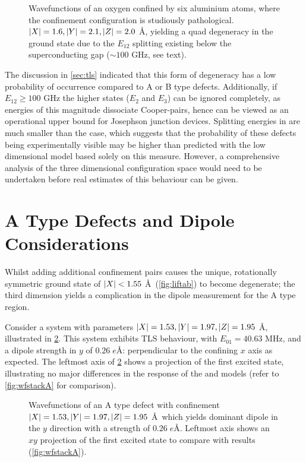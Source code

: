 \begin{figure}[htp]
  \resizebox{\textwidth}{!}{}
  \caption[Quad Degeneracy Configuration]{\label{fig:linequad}Wavefunctions of an oxygen confined by six aluminium atoms, where the confinement configuration is studiously pathological. $\lvert X\rvert = 1.6, \lvert Y\rvert = 2.1, \lvert Z\rvert = 2.0$ \AA, yielding a quad degeneracy in the ground state due to the $E_{12}$ splitting existing below the superconducting gap ($\sim\! 100$ GHz, see text).  }
\end{figure}

The discussion in \cref{sec:tls} indicated that this form of degeneracy has a low probability of occurrence compared to A or B type defects.
Additionally, if $E_{12} \geq 100$ GHz the higher states ($E_{2}$ and $E_{3}$) can be ignored completely, as energies of this magnitude dissociate Cooper-pairs, hence can be viewed as an operational upper bound for Josephson junction devices.
Splitting energies in  are much smaller than the  case, which suggests that the probability of these defects being experimentally visible may be higher than predicted with the low dimensional model based solely on this measure.
However, a comprehensive analysis of the three dimensional configuration space would need to be undertaken before real estimates of this behaviour can be given.

\section{A Type Defects and Dipole Considerations}\label{sec:atype3d}

Whilst adding additional confinement pairs causes the unique, rotationally symmetric ground state of $\lvert X\rvert < 1.55$ \AA\ (\cref{fig:liftab}) to become degenerate; the third dimension yields a complication in the dipole measurement for the A type region.

Consider a system with parameters $\lvert X\rvert = 1.53, \lvert Y\rvert = 1.97, \lvert Z\rvert = 1.95$ \AA, illustrated in \cref{fig:atypey}.
This system exhibits TLS behaviour, with $E_{01} = 40.63$ MHz, and a dipole strength in $y$ of $0.26 \; e$\AA: perpendicular to the confining $x$ axis as expected.
The leftmost axis of \cref{fig:atypey} shows a  projection of the first excited state, illustrating no major differences in the response of the  and  models (refer to \cref{fig:wfstackA} for comparison).

\begin{figure}[htp]
  \resizebox{\textwidth}{!}{}
  \caption[B Type Defect in \textit{y}]{\label{fig:atypey}Wavefunctions of an A type defect with confinement $\lvert X\rvert = 1.53, \lvert Y\rvert = 1.97, \lvert Z\rvert = 1.95$ \AA\ which yields dominant dipole in the $y$ direction with a strength of $0.26 \; e$\AA. Leftmost axis shows an $xy$ projection of the first excited state to compare with  results (\cref{fig:wfstackA}).}
\end{figure}

